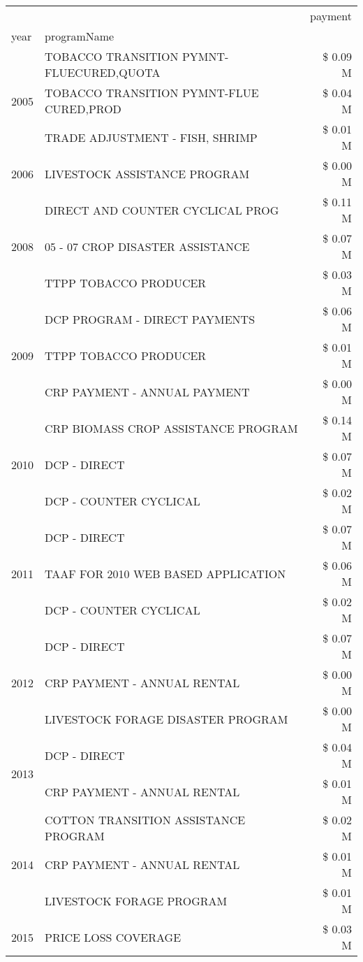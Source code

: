 \begin{tabular}{llr}
\toprule
 &  & payment \\
year & programName &  \\
\midrule
\multirow[t]{3}{*}{2005} & TOBACCO TRANSITION PYMNT-FLUECURED,QUOTA & \$ 0.09 M \\
 & TOBACCO TRANSITION PYMNT-FLUE CURED,PROD & \$ 0.04 M \\
 & TRADE ADJUSTMENT - FISH, SHRIMP & \$ 0.01 M \\
\cline{1-3}
2006 & LIVESTOCK ASSISTANCE PROGRAM & \$ 0.00 M \\
\cline{1-3}
\multirow[t]{3}{*}{2008} & DIRECT AND COUNTER CYCLICAL PROG & \$ 0.11 M \\
 & 05 - 07 CROP DISASTER ASSISTANCE & \$ 0.07 M \\
 & TTPP TOBACCO PRODUCER & \$ 0.03 M \\
\cline{1-3}
\multirow[t]{3}{*}{2009} & DCP PROGRAM - DIRECT PAYMENTS & \$ 0.06 M \\
 & TTPP TOBACCO PRODUCER & \$ 0.01 M \\
 & CRP PAYMENT - ANNUAL PAYMENT & \$ 0.00 M \\
\cline{1-3}
\multirow[t]{3}{*}{2010} & CRP BIOMASS CROP ASSISTANCE PROGRAM & \$ 0.14 M \\
 & DCP - DIRECT & \$ 0.07 M \\
 & DCP - COUNTER CYCLICAL & \$ 0.02 M \\
\cline{1-3}
\multirow[t]{3}{*}{2011} & DCP - DIRECT & \$ 0.07 M \\
 & TAAF FOR 2010 WEB BASED APPLICATION & \$ 0.06 M \\
 & DCP - COUNTER CYCLICAL & \$ 0.02 M \\
\cline{1-3}
\multirow[t]{3}{*}{2012} & DCP - DIRECT & \$ 0.07 M \\
 & CRP PAYMENT - ANNUAL RENTAL & \$ 0.00 M \\
 & LIVESTOCK FORAGE DISASTER PROGRAM & \$ 0.00 M \\
\cline{1-3}
\multirow[t]{2}{*}{2013} & DCP - DIRECT & \$ 0.04 M \\
 & CRP PAYMENT - ANNUAL RENTAL & \$ 0.01 M \\
\cline{1-3}
\multirow[t]{3}{*}{2014} & COTTON TRANSITION ASSISTANCE PROGRAM & \$ 0.02 M \\
 & CRP PAYMENT - ANNUAL RENTAL & \$ 0.01 M \\
 & LIVESTOCK FORAGE PROGRAM & \$ 0.01 M \\
\cline{1-3}
\multirow[t]{3}{*}{2015} & PRICE LOSS COVERAGE & \$ 0.03 M \\

\end{tabular}
